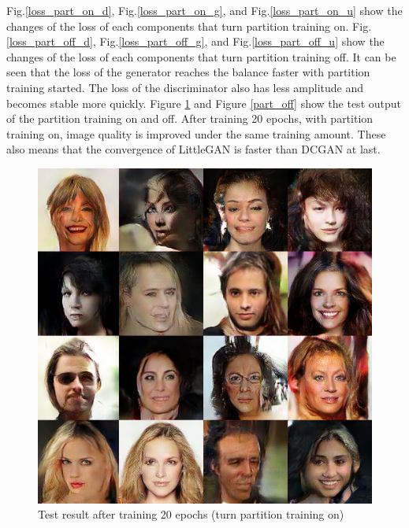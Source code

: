 Fig.\ref{loss_part_on_d}, Fig.\ref{loss_part_on_g}, and Fig.\ref{loss_part_on_u} show the changes of the loss of each components that turn partition training on.
Fig.\ref{loss_part_off_d}, Fig.\ref{loss_part_off_g}, and Fig.\ref{loss_part_off_u} show the changes of the loss of each components that turn partition training off.
It can be seen that the loss of the generator reaches the balance faster with partition training started.
 The loss of the discriminator also has less amplitude and becomes stable more quickly.
Figure \ref{part_on} and Figure \ref{part_off} show the test output of the partition training on and off.
After training 20 epochs, with partition training on, image quality is improved under the same training amount.
These also means that the convergence of LittleGAN is faster than DCGAN at last.

    \begin{figure}
        \begin{minipage}[t]{0.48\linewidth}
            \centering
            \includegraphics[width=\textwidth]{figures/result_part_on.png}
            \caption{Test result after training 20 epochs (turn partition training on)}
            \label{part_on}
        \end{minipage}
            \hfill
        \begin{minipage}[t]{0.48\linewidth}

\end{minipage}
\end{figure}
